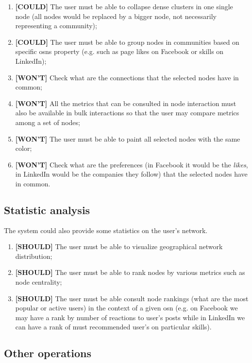 \begin{enumerate}
    \item \textbf{[COULD]} The user must be able to collapse dense clusters in one single node (all nodes would be replaced by a bigger node, not necessarily representing a community); %
    \item \textbf{[COULD]} The user must be able to group nodes in communities based on specific \glspl{osn} property (e.g. such as page likes on Facebook or skills on LinkedIn);
    \item \textbf{[WON'T]} Check what are the connections that the selected nodes have in common;
    \item \textbf{[WON'T]} All the metrics that can be consulted in node interaction must also be available in bulk interactions so that the user may compare metrics among a set of nodes;
    \item \textbf{[WON'T]} The user must be able to paint all selected nodes with the same color;
    \item \textbf{[WON'T]} Check what are the preferences (in Facebook it would be the \textit{likes}, in LinkedIn would be the companies they follow) that the selected nodes have in common.
\end{enumerate}

\subsection{Statistic analysis}

The system could also provide some statistics on the user's network.

\begin{enumerate}
    \item \textbf{[SHOULD]} The user must be able to visualize geographical network distribution;
    \item \textbf{[SHOULD]} The user must be able to rank nodes by various metrics such as node centrality;
    \item \textbf{[SHOULD]} The user must be able consult node rankings (what are the most popular or active users) in the context of a given \gls{osn} (e.g. on Facebook we may have a rank by number of reactions to user's posts while in LinkedIn we can have a rank of must recommended user's on particular skills).
\end{enumerate}

\subsection{Other operations}

